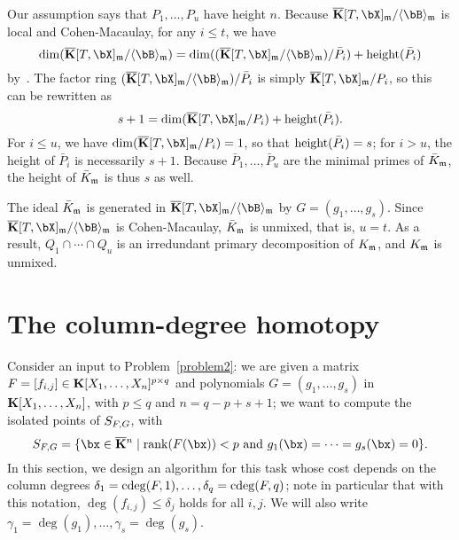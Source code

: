 \documentclass[12pt]{article}
\begin{document}
Our assumption says that $P_1,\dots,P_u$ have height $n$. Because
$\KKbar[T,\bX]_\m/\langle \bB \rangle_\m$ is local and Cohen-Macaulay, for any
$i \le t$, we have 
$$\dim(\KKbar[T,\bX]_\m/\langle \bB \rangle_\m)=\dim((\KKbar[T,\bX]_\m/\langle \bB \rangle_\m) / \bar P_i) + {\rm height}(\bar P_i)$$
by~\cite[Theorem~17.4(i)]{Matsumura86}.
The factor ring $(\KKbar[T,\bX]_\m/\langle \bB \rangle_\m) / \bar P_i$ is simply
$\KKbar[T,\bX]_\m/P_i$, so this can be rewritten as
$$s+1 = \dim(\KKbar[T,\bX]_\m/P_i) + {\rm height}(\bar P_i).$$ For $i\le
u$, we have $\dim(\KKbar[T,\bX]_\m/P_i)=1$, so that ${\rm height}(\bar
P_i)=s$; for $i > u$, the height of $\bar P_i$ is necessarily
$s+1$. Because $\bar P_1,\dots,\bar P_u$ are the minimal primes of
$\bar K_{\mathfrak{m}}$, the height of $\bar K_{\mathfrak{m}}$ is thus $s$ as well.

The ideal $\bar K_{\mathfrak{m}}$ is generated in $\KKbar[T,\bX]_\m/\langle \bB
\rangle_\m$ by $G=(g_1,\dots,g_s)$. Since $\KKbar[T,\bX]_\m/\langle
\bB \rangle_\m$ is Cohen-Macaulay, $\bar K_{\mathfrak{m}}$ is unmixed, that is,
$u=t$.  As a result, $Q_1 \cap \cdots \cap Q_u$ is an irredundant
primary decomposition of $K_{\mathfrak{m}}$, and $K_{\mathfrak{m}}$ is unmixed.


\section{The column-degree homotopy}\label{sec:columndegree}

Consider an input to Problem~\ref{problem2}: we are given a matrix
${F} =[f_{i,j}]\in \mathbf{K}[X_1,\dots,X_n]^{p \times q}$ and polynomials
$G=(g_1,\dots,g_s)$ in $\mathbf{K}[X_1,\dots,X_n]$, with $p \leq q$ and $n =
q-p+s+1$; we want to compute the isolated points of $S_{{F},G}$,
with
$$S_{\mF,G} = \{\bx \in \KKbar{}^n \mid  \mathrm{rank}(\mF({\bx})) < p
\text{~and~} g_1(\bx)=\cdots=g_s(\bx)=0\}.$$
In this section, we design an algorithm for this task whose cost
depends on the column degrees
$\delta_1=\mathrm{cdeg}({F},1),\dots,\delta_q=\mathrm{cdeg}({F},q)$; note in
particular that with this notation, $\deg(f_{i,j}) \leq \delta_j$
holds for all $i,j$.  We will also write
$\gamma_1=\deg(g_1),\dots,\gamma_s=\deg(g_s)$.
\end{document}
